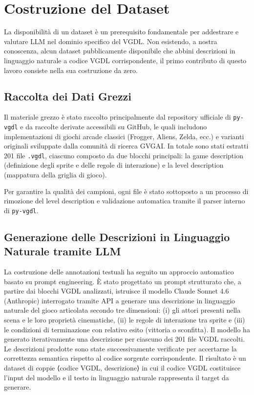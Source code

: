 \documentclass[final,5p,times,twocolumn]{elsarticle}
\begin{document}
\section{Costruzione del Dataset}

La disponibilità di un dataset è un prerequisito fondamentale per addestrare e valutare LLM nel dominio specifico del VGDL. Non esistendo, a nostra conoscenza, alcun dataset pubblicamente disponibile che abbini descrizioni in linguaggio naturale a codice VGDL corrispondente, il primo contributo di questo lavoro consiste nella sua costruzione da zero.

\subsection{Raccolta dei Dati Grezzi}

Il materiale grezzo è stato raccolto principalmente dal repository ufficiale di \texttt{py-vgdl} e da raccolte derivate accessibili su GitHub, le quali includono implementazioni di giochi arcade classici (Frogger, Aliens, Zelda, ecc.) e varianti originali sviluppate dalla comunità di ricerca GVGAI. In totale sono stati estratti 201 file \texttt{.vgdl}, ciascuno composto da due blocchi principali: la game description (definizione degli sprite e delle regole di interazione) e la level description (mappatura della griglia di gioco).

Per garantire la qualità dei campioni, ogni file è stato sottoposto a un processo di rimozione del level description e validazione automatica tramite il parser interno di \texttt{py-vgdl}.

\subsection{Generazione delle Descrizioni in Linguaggio Naturale tramite LLM}

La costruzione delle annotazioni testuali ha seguito un approccio automatico basato su prompt engineering. È stato progettato un prompt strutturato che, a partire dai blocchi VGDL analizzati, istruisce il modello Claude Sonnet 4.6 (Anthropic) interrogato tramite API a generare una descrizione in linguaggio naturale del gioco articolata secondo tre dimensioni: (i) gli attori presenti nella scena e le loro proprietà cinematiche, (ii) le regole di interazione tra sprite e (iii) le condizioni di terminazione con relativo esito (vittoria o sconfitta). 
Il modello ha generato iterativamente una descrizione per ciascuno dei 201 file VGDL raccolti. Le descrizioni prodotte sono state successivamente verificate per accertarne la correttezza semantica rispetto al codice sorgente corrispondente. 
Il risultato è un dataset di coppie ⟨codice VGDL, descrizione⟩ in cui il codice VGDL costituisce l'input del modello e il testo in linguaggio naturale rappresenta il target da generare.
\end{document}
